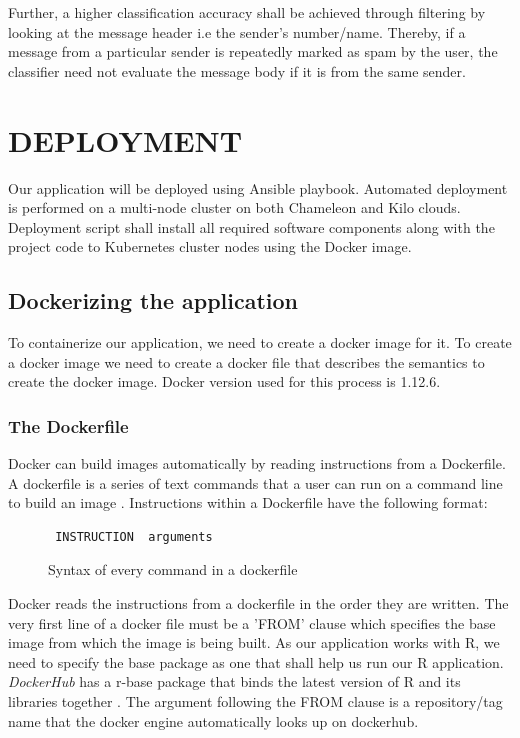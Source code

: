\documentclass[9pt,twocolumn,twoside]{../../styles/osajnl}
\begin{document}
{\noindent
Further, a higher classification accuracy shall be achieved through
filtering by looking at the message header i.e the sender's
number/name. Thereby, if a message from a particular sender is
repeatedly marked as spam by the user, the classifier need not
evaluate the message body if it is from the same sender.

\section{DEPLOYMENT}
Our application will be deployed using Ansible playbook. Automated
deployment is performed on a multi-node cluster on both Chameleon and
Kilo clouds. Deployment script shall install all required software
components along with the project code to Kubernetes cluster nodes using the
Docker image.

\subsection{Dockerizing the application}
To containerize our application, we need to create a docker image for
it. To create a docker image we need to create a docker file that
describes the semantics to create the docker image. Docker version
used for this process is 1.12.6.

\subsubsection{The Dockerfile}
Docker can build images automatically by reading instructions from a
Dockerfile. A dockerfile is a series of text commands that a user can
run on a command line to build an image \cite{www-dockerfile-documentation}.
\newline
Instructions within a Dockerfile have the following format:
\begin{figure}[h]
\begin{verbatim}
 INSTRUCTION  arguments
\end{verbatim}
\caption{Syntax of every command in a dockerfile}
\label{Syntax of every command in a dockerfile}
\end{figure}

\noindent
Docker reads the instructions from a dockerfile in the order they are
written. The very first line of a docker file must be a 'FROM' clause
which specifies the base image from which the image is being built. As
our application works with R, we need to specify the base package as
one that shall help us run our R application. \emph{DockerHub}
\cite{www-dockerhub-libraries} has a r-base package that binds the
latest version of R and its libraries together
\cite{www-rbase-docker}. The argument following the FROM clause is a
repository/tag name that the docker engine automatically looks up on
dockerhub.

}
\end{document}
